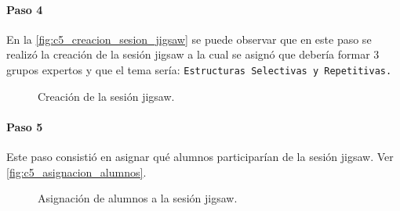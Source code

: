 \paragraph{Paso 4}
En la \autoref{fig:c5_creacion_sesion_jigsaw} se puede observar que en este paso se realizó la creación de la sesión jigsaw a la cual se asignó que debería formar 3 grupos expertos y que el tema sería: \texttt{Estructuras Selectivas y Repetitivas.} 

\begin{figure}
	\centering
	\caption{Creación de la sesión jigsaw.}
	\label{fig:c5_creacion_sesion_jigsaw}
\end{figure}

\paragraph{Paso 5}
Este paso consistió en asignar qué alumnos participarían de la sesión jigsaw. Ver \autoref{fig:c5_asignacion_alumnos}.

\begin{figure}
	\centering
	\caption{Asignación de alumnos a la sesión jigsaw.}
	\label{fig:c5_asignacion_alumnos}
\end{figure}

